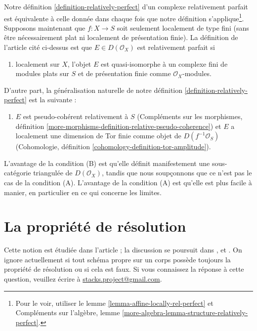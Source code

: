 \begin{remark}
\label{remark-discuss-rel-perfect}
Notre définition \ref{definition-relatively-perfect} d'un
complexe relativement parfait est équivalente à celle donnée
dans \cite{lieblich-complexes} chaque fois que notre définition s'applique\footnote{Pour
le voir, utiliser le lemme \ref{lemma-affine-locally-rel-perfect} et
Compléments sur l'algèbre, lemme \ref{more-algebra-lemma-structure-relatively-perfect}.}.
Supposons maintenant que $f : X \to S$ soit seulement localement
de type fini (sans être nécessairement plat ni localement de
présentation finie). La définition de l'article cité ci-dessus est que
$E \in D(\mathcal{O}_X)$ est relativement parfait si
\begin{enumerate}
\item[(A)] localement sur $X$, l'objet $E$ est
quasi-isomorphe à un complexe fini de
modules plats sur $S$ et de présentation finie comme $\mathcal{O}_X$-modules.
\end{enumerate}
D'autre part, la généralisation naturelle de notre
définition \ref{definition-relatively-perfect} est la suivante :
\begin{enumerate}
\item[(B)] $E$ est pseudo-cohérent relativement à $S$
(Compléments sur les morphismes, définition
\ref{more-morphisms-definition-relative-pseudo-coherence})
et $E$ a localement une dimension de Tor finie comme objet de
$D(f^{-1}\mathcal{O}_S)$
(Cohomologie, définition \ref{cohomology-definition-tor-amplitude}).
\end{enumerate}
L'avantage de la condition (B) est qu'elle définit manifestement une sous-catégorie
triangulée de $D(\mathcal{O}_X)$, tandis que nous soupçonnons que ce n'est pas
le cas de la condition (A). L'avantage de la condition (A)
est qu'elle est plus facile à manier, en particulier en ce qui concerne les limites.
\end{remark}








\section{La propriété de résolution}
\label{section-resolution-property}

\noindent
Cette notion est étudiée dans l'article \cite{totaro_resolution} ;
la discussion se poursuit dans \cite{Gross-thesis},
\cite{Gross-surface} et \cite{Gross-stack}.
On ignore actuellement si tout schéma propre sur un corps
possède toujours la propriété de résolution ou si cela est faux.
Si vous connaissez la réponse à cette question, veuillez écrire à
\href{mailto:stacks.project@gmail.com}{stacks.project@gmail.com}.


